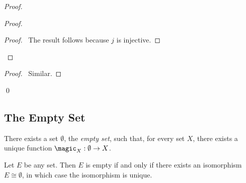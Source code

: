 \begin{proof}
  \pf
  \begin{proof}
    \qedstep
    \begin{proof}
      \pf\ The result follows because $j$ is injective.
    \end{proof}
  \end{proof}
  \begin{proof}
    \pf\ Similar.
  \end{proof}
  \qed
\end{proof}

\subsection{The Empty Set}

\begin{ax}
  There exists a set $\emptyset$, the \emph{empty set}, such that, for every
  set $X$, there exists a unique function $\magic_X : \emptyset \rightarrow
  X$.
\end{ax}

\begin{prop}
  \label{prop:sets:empty:unique}
  Let $E$ be any set. Then $E$ is empty if and only if there exists an isomorphism $E \cong \emptyset$, in which case the isomorphism is unique.
\end{prop}

